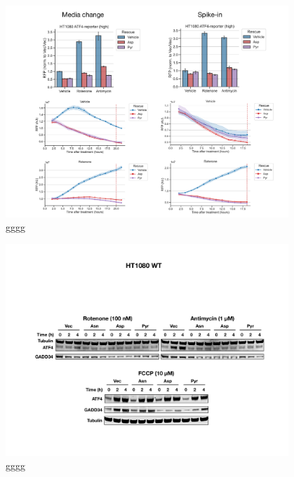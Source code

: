 \begin{figure}
    \centering
    \includegraphics[width=0.95\textwidth]{figures/chap2/app/atf4_chVSsp.pdf}
    \caption[APP GGGG]{
    gggg
    }
    \label{fig:app_ch2:sal_frac_conc}
\end{figure}


\begin{figure}
    \centering
    \includegraphics[width=0.95\textwidth]{figures/chap2/app/HT1080_ISR_western.pdf}
    \caption[APP GGGG]{
    gggg
    }
    \label{fig:app_ch2:HT1080_ISR_western}
\end{figure}



